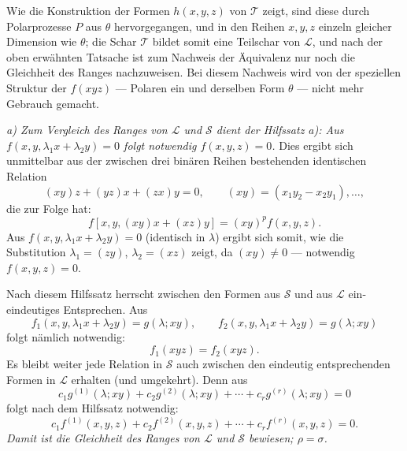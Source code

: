 \documentclass[11pt]{article}
\begin{document}
Wie die Konstruktion der Formen $h(x,y,z)$ von $\mathcal T$ zeigt, sind diese durch Polarprozesse $P$ aus $\theta$ hervorgegangen, und in den Reihen $x,y,z$ einzeln gleicher Dimension wie $\theta$; die Schar $\mathcal T$ bildet somit eine Teilschar von $\mathcal L$, und nach der oben erwähnten Tatsache ist zum Nachweis der Äquivalenz nur noch die Gleichheit des Ranges nachzuweisen. Bei diesem Nachweis wird von der speziellen Struktur der $f(xyz)$ --- Polaren ein und derselben Form $\theta$ --- nicht mehr Gebrauch gemacht.

\emph{a) Zum Vergleich des Ranges von $\mathcal L$ und $\mathcal S$ dient der Hilfssatz a): Aus $f(x,y,\lambda_1x+\lambda_2y)=0$ folgt notwendig $f(x,y,z)=0$.} Dies ergibt sich unmittelbar aus der zwischen drei binären Reihen bestehenden identischen Relation
\[
  (xy)z+(yz)x+(zx)y=0,
  \qquad (xy)=(x_1y_2-x_2y_1),\ldots,
\]
die zur Folge hat:
\[
  f[x,y,(xy)x+(xz)y]=(xy)^p f(x,y,z).
\]
Aus $f(x,y,\lambda_1x+\lambda_2y)=0$ (identisch in $\lambda$) ergibt sich somit, wie die Substitution $\lambda_1=(zy)$, $\lambda_2=(xz)$ zeigt, da $(xy)\ne0$ --- notwendig $f(x,y,z)=0$.

Nach diesem Hilfssatz herrscht zwischen den Formen aus $\mathcal S$ und aus $\mathcal L$ ein-eindeutiges Entsprechen. Aus
\[
  f_1(x,y,\lambda_1x+\lambda_2y)=g(\lambda;xy),\qquad
  f_2(x,y,\lambda_1x+\lambda_2y)=g(\lambda;xy)
\]
folgt nämlich notwendig:
\[
  f_1(xyz)=f_2(xyz).
\]
Es bleibt weiter jede Relation in $\mathcal S$ auch zwischen den eindeutig entsprechenden Formen in $\mathcal L$ erhalten (und umgekehrt). Denn aus
\[
  c_1g^{(1)}(\lambda;xy)+c_2g^{(2)}(\lambda;xy)+\cdots+c_rg^{(r)}(\lambda;xy)=0
\]
folgt nach dem Hilfssatz notwendig:
\[
  c_1f^{(1)}(x,y,z)+c_2f^{(2)}(x,y,z)+\cdots+c_rf^{(r)}(x,y,z)=0.
\]
\emph{Damit ist die Gleichheit des Ranges von $\mathcal L$ und $\mathcal S$ bewiesen; $\rho=\sigma$.}
\end{document}

